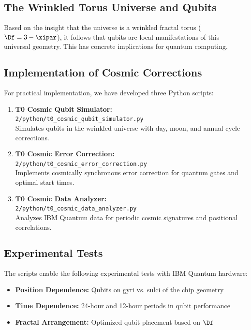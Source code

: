 \subsection{The Wrinkled Torus Universe and Qubits}

Based on the insight that the universe is a wrinkled fractal torus
($\Df = 3 - \xipar$), it follows that qubits are local manifestations of this
universal geometry. This has concrete implications for quantum computing.

\subsection{Implementation of Cosmic Corrections}

For practical implementation, we have developed three Python scripts:

\begin{enumerate}
	\item \textbf{T0 Cosmic Qubit Simulator:} \\
	\texttt{2/python/t0\_cosmic\_qubit\_simulator.py} \\
	Simulates qubits in the wrinkled universe with day, moon, and annual cycle corrections.
	
	\item \textbf{T0 Cosmic Error Correction:} \\
	\texttt{2/python/t0\_cosmic\_error\_correction.py} \\
	Implements cosmically synchronous error correction for quantum gates and optimal start times.
	
	\item \textbf{T0 Cosmic Data Analyzer:} \\
	\texttt{2/python/t0\_cosmic\_data\_analyzer.py} \\
	Analyzes IBM Quantum data for periodic cosmic signatures and positional correlations.
\end{enumerate}

\subsection{Experimental Tests}

The scripts enable the following experimental tests with IBM Quantum hardware:

\begin{itemize}
	\item \textbf{Position Dependence:} Qubits on gyri vs. sulci of the chip geometry
	\item \textbf{Time Dependence:} 24-hour and 12-hour periods in qubit performance
	\item \textbf{Fractal Arrangement:} Optimized qubit placement based on $\Df$
\end{itemize}

